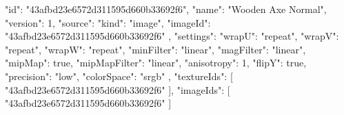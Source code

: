 {
  "id": "43afbd23e6572d311595d660b33692f6",
  "name": "Wooden Axe Normal",
  "version": 1,
  "source": {
    "kind": "image",
    "imageId": "43afbd23e6572d311595d660b33692f6"
  },
  "settings": {
    "wrapU": "repeat",
    "wrapV": "repeat",
    "wrapW": "repeat",
    "minFilter": "linear",
    "magFilter": "linear",
    "mipMap": true,
    "mipMapFilter": "linear",
    "anisotropy": 1,
    "flipY": true,
    "precision": "low",
    "colorSpace": "srgb"
  },
  "textureIds": [
    "43afbd23e6572d311595d660b33692f6"
  ],
  "imageIds": [
    "43afbd23e6572d311595d660b33692f6"
  ]
}
